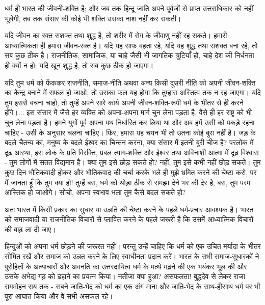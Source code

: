 धर्म ही भारत की जीवनी-शक्ति है; और जब तक हिन्दू जाति अपने पूर्वजों से प्राप्त उत्तराधिकार को नहीं भूलेगी, तब तक संसार की कोई भी शक्ति उसका नाश नहीं कर सकती। 

यदि जीवन का रक्त सशक्त तथा शुद्ध है, तो शरीर में रोग के जीवाणु नहीं रह सकते। हमारी आध्यात्मिकता ही हमारा जीवन-रक्त है। यदि यह साफ बहता रहे, यदि यह शुद्ध तथा सशक्त बना रहे, तो सब कुछ ठीक है। राजनीतिक, सामाजिक, या चाहे जैसी भी जागतिक त्रुटियाँ हों, चाहे देश की निर्धनता ही क्यों न हो; यदि खून शुद्ध है, तो सब कुछ ठीक हो जाएगा। 

यदि तुम धर्म को फेंककर राजनीति, समाज-नीति अथवा अन्य किसी दूसरी नीति को अपनी जीवन-शक्ति का केन्द्र बनाने में सफल हो जाओ, तो उसका फल यह होगा कि तुम्हारा अस्तित्व तक न रह जाएगा। यदि तुम इससे बचना चाहो, तो तुम्हें अपने सारे कार्य अपनी जीवन-शक्ति-रूपी धर्म के भीतर से ही करने होंगे।... इस संसार में जैसे हर व्यक्ति को अपना-अपना मार्ग चुन लेना पड़ता है, वैसे ही हर राष्ट्र को भी चुन लेना पड़ता है। हमने युगों पूर्व अपना पथ निर्धारित कर लिया था और अब हमें उसी को पकड़े रहना चाहिए - उसी के अनुसार चलना चाहिए। फिर, हमारा यह चयन भी तो उतना कोई बुरा नहीं है। जड़ के बदले चैतन्य का, मनुष्य के बदले ईश्वर का चिन्तन करना, क्या संसार में इतनी बुरी चीज है? परलोक में दृढ़ आस्था, इस लोक के प्रति विरक्ति, प्रबल त्याग-शक्ति और ईश्वर तथा अविनाशी आत्मा में दृढ़ विश्वास - तुम लोगों में सतत विद्यमान है। क्या तुम इसे छोड़ सकते हो? नहीं, तुम इसे कभी नहीं छोड़ सकते। तुम कुछ दिन भौतिकवादी होकर और भौतिकवाद की चर्चा करके भले ही मुझे भ्रमित करने की चेष्टा करो, पर मैं जानता हूँ कि तुम क्या हो! तुम्हें बस, धर्म को थोड़ा ठीक से समझा देने भर की देर है, बस, तुम परम आस्तिक हो जाओगे। सोचो, अपना स्वभाव भला तुम कैसे बदल सकते हो? 

अतः भारत में किसी प्रकार का सुधार या उन्नति की चेष्टा करने के पहले धर्म-प्रचार आवश्यक है। भारत को समाजवादी या राजनीतिक विचारों से प्लावित करने के पहले जरूरी है कि उसमें आध्यात्मिक विचारों की बाढ़ ला दी जाए। 

हिन्दुओं को अपना धर्म छोड़ने की जरूरत नहीं। परन्तु उन्हें चाहिए कि धर्म को एक उचित मर्यादा के भीतर सीमित रखें और समाज को उन्नत करने के लिए स्वाधीनता प्रदान करें। भारत के सभी समाज-सुधारकों ने पुरोहितों के अत्याचारों और अवनति का उत्तरदायित्व धर्म के मत्थे मढ़ने की एक भयंकर भूल की और उसके अभेद्य गढ़ को ढहाने का प्रयत्न किया। नतीजा क्या हुआ? असफलता! बुद्धदेव से लेकर राजा राममोहन राय तक - सबने जाति-भेद को धर्म का एक अंग माना और जाति-भेद के साथ-हीसाथ धर्म पर भी पूरा आघात किया और वे सभी असफल रहे। 

